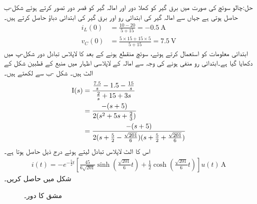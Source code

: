 حل:چالو سوئچ کی صورت میں برق گیر کو کھلا دور اور امالہ گیر کو قصر دور تصور کرتے ہوئے شکل-ب حاصل ہوتی ہے جہاں سے  امالہ گیر کی ابتدائی رو  اور برق گیر کی ابتدائی دباؤ  حاصل کرتے ہیں۔
\begin{align*}
i_L(0)&=\frac{10-20}{5+15}=\SI{-0.5}{\ampere}\\
v_C(0)&=\frac{5\times 15+15\times 5 }{5+15}=\SI{7.5}{\volt}
\end{align*}
ابتدائی معلومات کو استعمال کرتے ہوئے، سوئچ منقطع ہونے کے بعد کا لاپلاس تبادل دور شکل-پ میں دکھایا گیا ہے۔ابتدائی رو منفی ہونے کی وجہ سے   امالہ کے لاپلاسی اظہار میں  منبع کے قطبین شکل  کے الٹ ہیں۔ شکل -ب سے  لکھتے ہیں۔
\begin{align*}
{\ensuremath{{\textup{I}}}}(s)&=\frac{\frac{7.5}{s}-1.5-\frac{15}{s}}{\frac{2}{s}+15+3s}\\
&=\frac{-(s+5)}{2(s^2+5s+\frac{2}{3})}\\
&=\frac{-(s+5)}{2(s+\frac{5}{2}-\frac{\sqrt{201}}{6})(s+\frac{5}{2}+\frac{\sqrt{201}}{6})}
\end{align*}
اس کا الٹ لاپلاس تبادل لیتے ہوئے درج ذیل حاصل ہوتا ہے۔
 \begin{align*}
i(t)=-e^{-\frac{5}{2}t}\left[\frac{45}{6\sqrt{201}} \sinh \left(\frac{\sqrt{201}}{6}t\right)+\frac{1}{2}\cosh \left(\frac{\sqrt{201}}{6}t\right)\right]u(t)\,\si{\ampere}
\end{align*}
شکل  میں  حاصل کریں۔
\begin{figure}
\centering
{}
\caption{مشق  کا دور۔}
\label{شکل_لاپلاس_استعمال_سوئچ_الف}
\end{figure}

